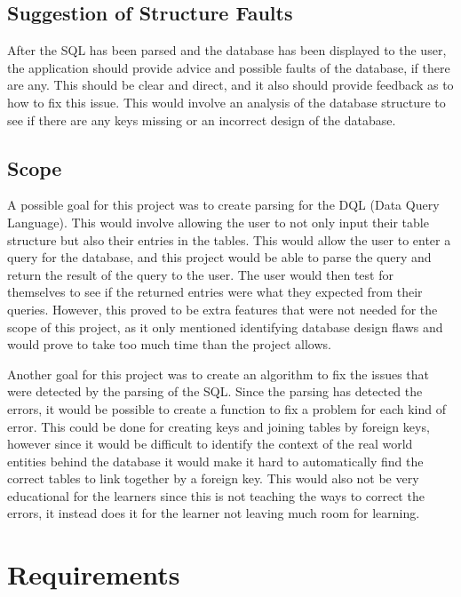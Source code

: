 \subsection{Suggestion of Structure Faults}

After the SQL has been parsed and the database has been displayed to the user, the application should provide advice and possible faults of the database, if there are any. This should be clear and direct, and it also should provide feedback as to how to fix this issue. This would involve an analysis of the database structure to see if there are any keys missing or an incorrect design of the database.

\subsection{Scope}
\label{subsec:scope}

A possible goal for this project was to create parsing for the DQL (Data Query Language). This would involve allowing the user to not only input their table structure but also their entries in the tables. This would allow the user to enter a query for the database, and this project would be able to parse the query and return the result of the query to the user. The user would then test for themselves to see if the returned entries were what they expected from their queries. However, this proved to be extra features that were not needed for the scope of this project, as it only mentioned identifying database design flaws and would prove to take too much time than the project allows.

Another goal for this project was to create an algorithm to fix the issues that were detected by the parsing of the SQL. Since the parsing has detected the errors, it would be possible to create a function to fix a problem for each kind of error. This could be done for creating keys and joining tables by foreign keys, however since it would be difficult to identify the context of the real world entities behind the database it would make it hard to automatically find the correct tables to link together by a foreign key. This would also not be very educational for the learners since this is not teaching the ways to correct the errors, it instead does it for the learner not leaving much room for learning. 

\section{Requirements}

